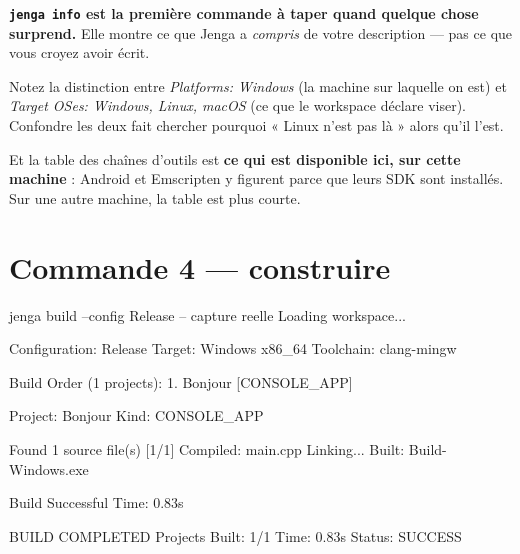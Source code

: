 \begin{nkretenir}
\textbf{\texttt{jenga info} est la première commande à taper quand quelque chose
surprend.} Elle montre ce que Jenga a \emph{compris} de votre description ---
pas ce que vous croyez avoir écrit.

Notez la distinction entre \emph{Platforms: Windows} (la machine sur laquelle on
est) et \emph{Target OSes: Windows, Linux, macOS} (ce que le workspace déclare
viser). Confondre les deux fait chercher pourquoi « Linux n'est pas là » alors
qu'il l'est.

Et la table des chaînes d'outils est \textbf{ce qui est disponible ici, sur cette
machine} : Android et Emscripten y figurent parce que leurs SDK sont installés.
Sur une autre machine, la table est plus courte.
\end{nkretenir}

\section{Commande 4 --- construire}

\begin{nkcode}{jenga build --config Release -- capture reelle}
Loading workspace...

Configuration: Release
Target:        Windows x86_64
Toolchain:     clang-mingw

Build Order (1 projects):
  1. Bonjour [CONSOLE_APP]

  Project: Bonjour                                     Kind: CONSOLE_APP

Found 1 source file(s)
  [1/1] Compiled: main.cpp
Linking...
Built: Build\Bin\Release-Windows\Bonjour\Bonjour.exe

  Build Successful                                        Time: 0.83s

                                BUILD COMPLETED
Projects Built:  1/1
Time:           0.83s
Status:         SUCCESS
\end{nkcode}

